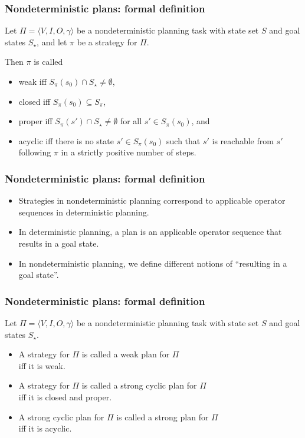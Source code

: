\documentclass{gkibeamer}
\begin{document}
\begin{frame}
  \frametitle{Nondeterministic plans: formal definition}

  \begin{definition}
    Let $\Pi = \langle V, I, O, \gamma\rangle$ be a nondeterministic
    planning task with state set $S$ and goal states $S_\star$, and let
    $\pi$ be a strategy for $\Pi$.

    Then $\pi$ is called
    \begin{itemize}
    \item \alert{weak} iff $S_\pi(s_0) \cap S_\star \neq \emptyset$,
    \item \alert{closed} iff $S_\pi(s_0) \subseteq S_\pi$,
    \item \alert{proper} iff $S_\pi(s') \cap S_\star \neq \emptyset$
      for all $s' \in S_\pi(s_0)$, and
    \item \alert{acyclic} iff there is no state $s' \in
      S_\pi(s_0)$ such that $s'$ is reachable from $s'$ following
      $\pi$ in a strictly positive number of steps.
    \end{itemize}
  \end{definition}
\end{frame}

\begin{frame}
  \frametitle{Nondeterministic plans: formal definition}
  \begin{itemize}
  \item \alert{Strategies} in nondeterministic planning correspond to
    \alert{applicable operator sequences} in deterministic planning.
  \item In deterministic planning, a \alert{plan} is an applicable
    operator sequence that results in a goal state.
  \item In nondeterministic planning, we define different notions of
    ``resulting in a goal state''.
  \end{itemize}
\end{frame}

\begin{frame}
  \frametitle{Nondeterministic plans: formal definition}

  \begin{definition}
    Let $\Pi = \langle V, I, O, \gamma\rangle$ be a nondeterministic
    planning task with state set $S$ and goal states $S_\star$.

    \begin{itemize}
    \item A strategy for $\Pi$ is called a \alert{weak plan} for $\Pi$ \\
      iff it is weak.
    \item A strategy for $\Pi$ is called a \alert{strong cyclic plan}
      for $\Pi$ \\
      iff it is closed and proper.
    \item A strong cyclic plan for $\Pi$ is called a \alert{strong
      plan} for $\Pi$ \\
      iff it is acyclic.
    \end{itemize}
  \end{definition}
\end{frame}
\end{document}
